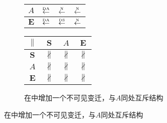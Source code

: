 \begin{figure}[htbp]
\begin{subfigure}{1\textwidth}
\begin{minipage}[b]{0.3\textwidth}
\begin{tabular}{|c|c|c|c|}
        $A$ & $\overset{\text{\tiny{DA}}}{\leftarrow}$ & $\overset{\text{\tiny{N}}}{\leftarrow}$ & $\overset{\text{\tiny{N}}}{\leftarrow}$\\ \hline
        $\bm{E}$ & $\overset{\text{\tiny{DA}}}{\leftarrow}$ & $\overset{\text{\tiny{DS}}}{\leftarrow}$ & $\overset{\text{\tiny{N}}}{\leftarrow}$\\ \hline
      \end{tabular}
    \end{minipage}
    \begin{minipage}[b]{0.3\textwidth}
      \vspace{1em}
      \centering
      \begin{tabular}{|c|c|c|c|} \hline
        $\parallel$ & $\bm{S}$ & $A$ & $\bm{E}$\\ \hline
        $\bm{S}$ & $\nparallel$ & $\nparallel$ & $\nparallel$\\ \hline
        $A$ & $\nparallel$ & $\nparallel$ & $\nparallel$\\ \hline
        $\bm{E}$ & $\nparallel$ & $\nparallel$ & $\nparallel$\\ \hline
      \end{tabular}
    \end{minipage}
    \caption{在中增加一个不可见变迁，与$A$同处互斥结构}
    \label{fig:uniqueness_3_c}
  \end{subfigure}


\end{figure}
